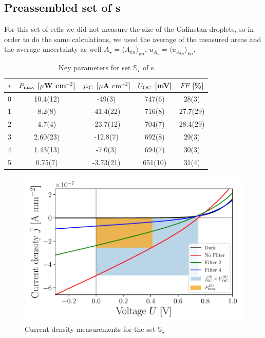 \documentclass[a4paper,10pt,twocolumn]{article}
\begin{document}
\begin{extract*}
\subsection{Preassembled set of \BHSC s}

For this set of cells we did not measure the size of the Galinstan droplets, so in order to do the same calculations, we used the average of the measured areas and the average uncertainty as well $A_\star = \langle A_{kn} \rangle_{kn}$, $u_{A_\star} = \langle u_{A_{kn}}  \rangle_{kn}$.

\begin{table}[h]\centering
	\caption{Key parameters for set $\mathbb{S}_\star$ of \BHSC s}
	\label{tab:keyparamsstar}
	\begin{tabular}{@{}ccccc@{}}\toprule
		$i$ & $P_{\text{max}}$ [$\mu$W cm$^{-2}$] & $j_{\text{SC}}$ [$\mu$A $\mathrm{cm}^{-2}$] & $U_{\text{OC}}$ [mV] & $FF$ [\%]\\\midrule
		0 &   10.4(12)  &  -49(3)  & 747(6) & 28(3) \\ 
		1 &   8.2(8)  &  -41.4(22)  & 716(8) & 27.7(29) \\
		2 &   4.7(4)  &  -23.7(12)  & 704(7) & 28.4(29) \\
		3 &   2.60(23)  &  -12.8(7)  & 692(8) & 29(3) \\
		4 &   1.43(13)  &  -7.0(3)  & 694(7) & 30(3)\\
		5 &  0.75(7)  &  -3.73(21)  & 651(10) & 31(4) \\\bottomrule
	\end{tabular}
\end{table}

\begin{figure}[H]\centering
	\includegraphics[width=\columnwidth]{../../../IV-Curve-Analysis/OSCPGraph.pdf}
	\caption{Current density measurements for the set $\mathbb{S}_\star$}
	\label{fig:OSCstarGraph}
\end{figure}

\end{extract*}
\end{document}

